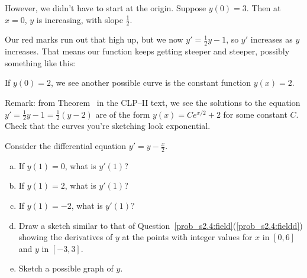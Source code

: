 \begin{solution}
\begin{enumerate}[(a)]
However, we didn't have to start at the origin. Suppose $y(0)=3$. Then at $x=0$, $y$ is increasing, with slope $\frac{1}{2}$.

\begin{center}
\end{center}
Our red marks run out that high up, but we now $y'=\frac{1}{2}y-1$, so $y'$ increases as $y$ increases. That means our function keeps getting steeper and steeper, possibly something like this:
\begin{center}
\end{center}
If $y(0)=2$, we see another possible curve is the constant function $y(x)=2$.
\end{enumerate}
Remark: from Theorem~ in the CLP--II text, we see the solutions to the equation $y'=\frac{1}{2}y-1 = \frac{1}{2}(y-2)$ are of the form $y(x)=Ce^{x/2}+2$ for some constant $C$. Check that the curves you're sketching look exponential.
\end{solution}
\begin{question}
Consider the differential equation $y'=y-\frac{x}{2}$.
\begin{enumerate}[(a)]
\item If $y(1)=0$, what is $y'(1)$?
\item If $y(1)=2$, what is $y'(1)$?
\item If $y(1)=-2$, what is $y'(1)$?
\item Draw a sketch similar to that of Question~\ref{prob_s2.4:field}(\ref{prob_s2.4:fieldd})
showing the derivatives of $y$ at the points with integer values for $x$ in $[0,6]$ and $y$ in $[-3,3]$.
\item Sketch a possible graph of $y$.
\end{enumerate}
\end{question}
